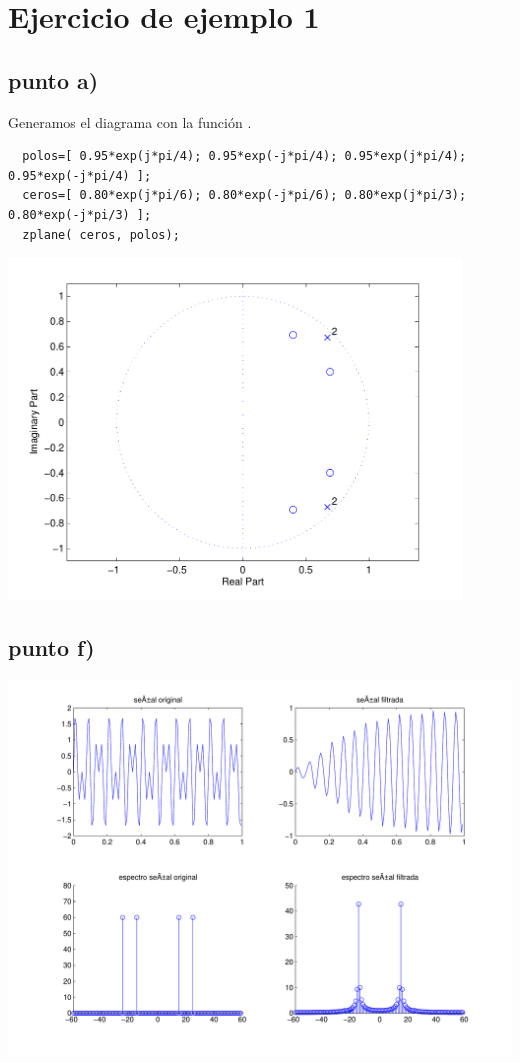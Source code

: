 \documentclass[a4paper]{article}
\begin{document}
%
\maketitle
%
% 
\section*{Ejercicio de ejemplo 1}
\subsection*{punto a)}

Generamos el diagrama con la función .
{\small
\begin{verbatim}
  polos=[ 0.95*exp(j*pi/4); 0.95*exp(-j*pi/4); 0.95*exp(j*pi/4); 0.95*exp(-j*pi/4) ];
  ceros=[ 0.80*exp(j*pi/6); 0.80*exp(-j*pi/6); 0.80*exp(j*pi/3); 0.80*exp(-j*pi/3) ];
  zplane( ceros, polos);
\end{verbatim}
}

\includegraphics[width=12cm]{img/ej1a}
\newpage
\subsection*{punto f)}


{\small

}
\includegraphics[width=16cm]{img/ej1f}
\end{document}
